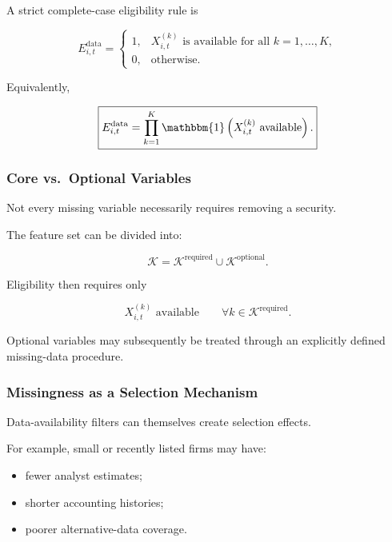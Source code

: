 \documentclass[11pt,a4paper]{article}
\begin{document}
A strict complete-case eligibility rule is

\begin{equation}
E_{i,t}^{\mathrm{data}}
=
\begin{cases}
1,
&
X_{i,t}^{(k)}
\text{ is available for all }
k=1,\ldots,K,
\\
0,
&
\text{otherwise}.
\end{cases}
\end{equation}

Equivalently,

\begin{equation}
\boxed{
E_{i,t}^{\mathrm{data}}
=
\prod_{k=1}^{K}
\mathbbm{1}
\left(
X_{i,t}^{(k)}
\text{ available}
\right).
}
\end{equation}


\subsubsection{Core vs.\ Optional Variables}

Not every missing variable necessarily requires removing a security.

The feature set can be divided into:

\begin{equation}
\mathcal{K}
=
\mathcal{K}^{\mathrm{required}}
\cup
\mathcal{K}^{\mathrm{optional}}.
\end{equation}

Eligibility then requires only

\begin{equation}
X_{i,t}^{(k)}
\text{ available}
\qquad
\forall
k\in
\mathcal{K}^{\mathrm{required}}.
\end{equation}

Optional variables may subsequently be treated through an explicitly defined
missing-data procedure.


\subsubsection{Missingness as a Selection Mechanism}

Data-availability filters can themselves create selection effects.

For example, small or recently listed firms may have:

\begin{itemize}
    \item fewer analyst estimates;
    \item shorter accounting histories;
    \item poorer alternative-data coverage.
\end{itemize}
\end{document}
